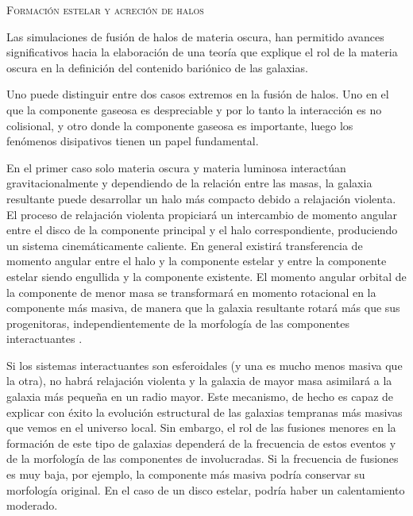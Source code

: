 \documentclass[xcolor=dvipsnames,4pt,hyperref={colorlinks,citecolor=black,linkcolor=black,urlcolor=black}]{beamer}
\begin{document}
\begin{frame}[allowframebreaks]{\textsc{Formación estelar y acreción de halos}}
\begin{description}
Las simulaciones de fusión de halos de materia oscura, han permitido avances significativos hacia la
elaboración de una teoría que explique el rol de la materia oscura en la definición del contenido
bariónico de las galaxias.

Uno puede distinguir entre dos casos extremos en la fusión de halos. Uno en el que la componente
gaseosa es despreciable y por lo tanto la interacción es no colisional, y otro donde la componente
gaseosa es importante, luego los fenómenos disipativos tienen un papel fundamental.

En el primer caso solo materia oscura y materia luminosa interactúan gravitacionalmente y
dependiendo de la relación entre las masas, la galaxia resultante puede desarrollar un halo más
compacto debido a relajación violenta. El proceso de relajación violenta propiciará un intercambio
de momento angular entre el disco de la componente principal y el halo correspondiente, produciendo
un sistema cinemáticamente caliente. En general existirá transferencia de momento angular entre el
halo y la componente estelar y entre la componente estelar siendo engullida y la componente
existente. El momento angular orbital de la componente de menor masa se transformará en momento
rotacional en la componente más masiva, de manera que la galaxia resultante rotará más que sus
progenitoras, independientemente de la morfología de las componentes interactuantes \citep{Qu2017}.

Si los sistemas interactuantes son esferoidales (y una es mucho menos masiva que la otra), no habrá
relajación violenta y la galaxia de mayor masa asimilará a la galaxia más pequeña en un radio mayor.
Este mecanismo, de hecho es capaz de explicar con éxito la evolución estructural de las galaxias
tempranas más masivas que vemos en el universo local. Sin embargo, el rol de las fusiones menores en
la formación de este tipo de galaxias dependerá de la frecuencia de estos eventos y de la morfología
de las componentes de involucradas. Si la frecuencia de fusiones es muy baja, por ejemplo, la
componente más masiva podría conservar su morfología original. En el caso de un disco estelar,
podría haber un calentamiento moderado.


\end{description}
\end{frame}
\end{document}
